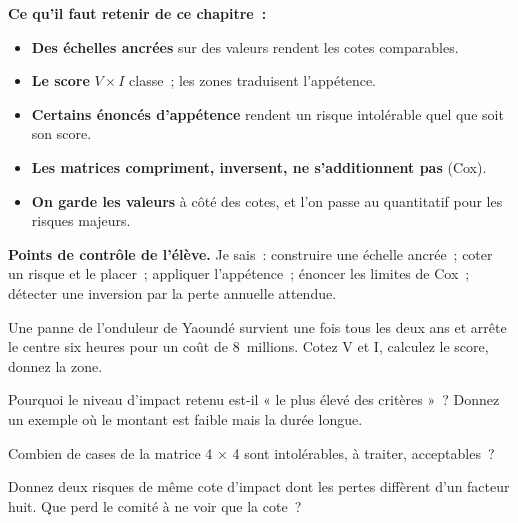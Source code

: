 \begin{boxresume}
\textbf{Ce qu'il faut retenir de ce chapitre~:}
\begin{itemize}
    \item \textbf{Des échelles ancrées} sur des valeurs rendent les cotes
          comparables.
    \item \textbf{Le score} $V \times I$ classe~; les zones traduisent
          l'appétence.
    \item \textbf{Certains énoncés d'appétence} rendent un risque
          intolérable quel que soit son score.
    \item \textbf{Les matrices compriment, inversent, ne s'additionnent
          pas} (Cox).
    \item \textbf{On garde les valeurs} à côté des cotes, et l'on passe au
          quantitatif pour les risques majeurs.
\end{itemize}
\end{boxresume}

\begin{boxinfo}
\textbf{Points de contrôle de l'élève.} Je sais~: construire une échelle
ancrée~; coter un risque et le placer~; appliquer l'appétence~; énoncer les
limites de Cox~; détecter une inversion par la perte annuelle attendue.
\end{boxinfo}

\bigskip

\begin{boxexo}[title={\ding{45}\quad Exercice~7.1. Coter \niveaubase}]
Une panne de l'onduleur de Yaoundé survient une fois tous les deux ans et
arrête le centre six heures pour un coût de 8~millions. Cotez V et I,
calculez le score, donnez la zone.
\end{boxexo}

\begin{boxexo}[title={\ding{45}\quad Exercice~7.2. Ancrer \niveaubase}]
Pourquoi le niveau d'impact retenu est-il « le plus élevé des critères »~?
Donnez un exemple où le montant est faible mais la durée longue.
\end{boxexo}

\begin{boxexo}[title={\ding{45}\quad Exercice~7.3. Zones \niveaubase}]
Combien de cases de la matrice 4 × 4 sont intolérables, à traiter,
acceptables~?
\end{boxexo}

\begin{boxexo}[title={\ding{45}\quad Exercice~7.4. Compression \niveaumoyen}]
Donnez deux risques de même cote d'impact dont les pertes diffèrent d'un
facteur huit. Que perd le comité à ne voir que la cote~?
\end{boxexo}

